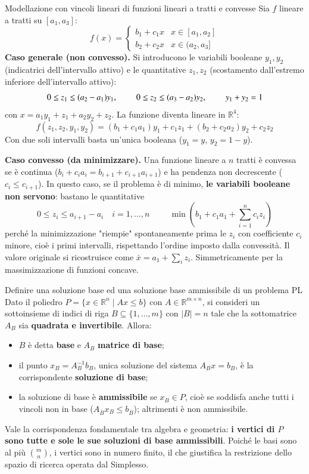 \documentclass[12pt]{extarticle} %
\begin{document}
\begin{teoriabox}{Modellazione con vincoli lineari di funzioni lineari a tratti e convesse}
Sia $f$ lineare a tratti su $[a_1,a_3]$:
\[
f(x) = \begin{cases} b_1 + c_1x & x \in [a_1,a_2]\\ b_2 + c_2x & x \in (a_2,a_3]\end{cases}
\]
\textbf{Caso generale (non convesso).} Si introducono le variabili booleane $y_1, y_2$ (indicatrici dell'intervallo attivo) e le quantitative $z_1, z_2$ (scostamento dall'estremo inferiore dell'intervallo attivo):
\[
0 \le z_1 \le (a_2-a_1)y_1, \hspace{0.8cm} 0 \le z_2 \le (a_3-a_2)y_2, \hspace{0.8cm} y_1+y_2 = 1
\]
con $x = a_1y_1 + z_1 + a_2y_2 + z_2$. La funzione diventa lineare in $\mathbb{R}^4$:
\[
f(z_1,z_2,y_1,y_2) = (b_1+c_1a_1)y_1 + c_1z_1 + (b_2+c_2a_2)y_2 + c_2z_2
\]
Con due soli intervalli basta un'unica booleana ($y_1 = y$, $y_2 = 1-y$).

\noindent\textbf{Caso convesso (da minimizzare).} Una funzione lineare a $n$ tratti è convessa se è continua ($b_i + c_ia_i = b_{i+1}+c_{i+1}a_{i+1}$) e ha pendenza non decrescente ($c_i \le c_{i+1}$). In questo caso, se il problema è di minimo, \textbf{le variabili booleane non servono}: bastano le quantitative
\[
0 \le z_i \le a_{i+1}-a_i \quad i=1,\dots,n \hspace{1cm} \min \left(b_1 + c_1a_1 + \sum_{i=1}^n c_i z_i\right)
\]
perché la minimizzazione "riempie" spontaneamente prima le $z_i$ con coefficiente $c_i$ minore, cioè i primi intervalli, rispettando l'ordine imposto dalla convessità. Il valore originale si ricostruisce come $\bar{x} = a_1 + \sum_i z_i$. Simmetricamente per la massimizzazione di funzioni concave.
\end{teoriabox}

\begin{teoriabox}{Definire una soluzione base ed una soluzione base ammissibile di un problema PL}
Dato il poliedro $P = \{x \in \mathbb{R}^n \mid Ax \le b\}$ con $A \in \mathbb{R}^{m\times n}$, si consideri un sottoinsieme di indici di riga $B \subseteq \{1,\dots,m\}$ con $|B| = n$ tale che la sottomatrice $A_B$ sia \textbf{quadrata e invertibile}. Allora:
\begin{itemize}
    \item $B$ è detta \textbf{base} e $A_B$ \textbf{matrice di base};
    \item il punto $x_B = A_B^{-1}b_B$, unica soluzione del sistema $A_Bx = b_B$, è la corrispondente \textbf{soluzione di base};
    \item la soluzione di base è \textbf{ammissibile} se $x_B \in P$, cioè se soddisfa anche tutti i vincoli non in base ($A_{\overline{B}}x_B \le b_{\overline{B}}$); altrimenti è non ammissibile.
\end{itemize}
Vale la corrispondenza fondamentale tra algebra e geometria: \textbf{i vertici di $P$ sono tutte e sole le sue soluzioni di base ammissibili}. Poiché le basi sono al più $\binom{m}{n}$, i vertici sono in numero finito, il che giustifica la restrizione dello spazio di ricerca operata dal Simplesso.
\end{teoriabox}
\end{document}
